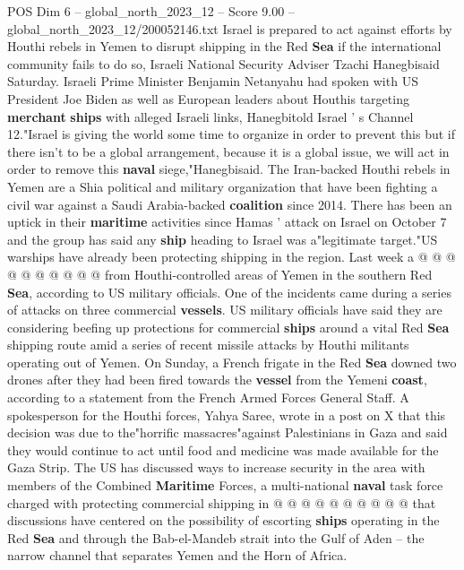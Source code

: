 \begin{textsample}{POS Dim 6 – global\_north\_2023\_12 – Score 9.00 – global\_north\_2023\_12/200052146.txt}  \label{ex:f6_pos_138}
Israel is prepared to act against efforts by Houthi rebels in Yemen to disrupt shipping in the Red \textbf{Sea} if the international community fails to do so, Israeli National Security Adviser Tzachi Hanegbisaid Saturday.
Israeli Prime Minister Benjamin Netanyahu had spoken with US President Joe Biden as well as European leaders about Houthis targeting \textbf{merchant} \textbf{ships} with alleged Israeli links, Hanegbitold Israel ' s Channel 12."Israel is giving the world some time to organize in order to prevent this but if there isn't to be a global arrangement, because it is a global issue, we will act in order to remove this \textbf{naval} siege,"Hanegbisaid.
The Iran-backed Houthi rebels in Yemen are a Shia political and military organization that have been fighting a civil war against a Saudi Arabia-backed \textbf{coalition} since 2014.
There has been an uptick in their \textbf{maritime} activities since Hamas ' attack on Israel on October 7 and the group has said any \textbf{ship} heading to Israel was a"legitimate target."US warships have already been protecting shipping in the region.
Last week a @ @ @ @ @ @ @ @ @ @ from Houthi-controlled areas of Yemen in the southern Red \textbf{Sea}, according to US military officials.
One of the incidents came during a series of attacks on three commercial \textbf{vessels}.
US military officials have said they are considering beefing up protections for commercial \textbf{ships} around a vital Red \textbf{Sea} shipping route amid a series of recent missile attacks by Houthi militants operating out of Yemen.
On Sunday, a French frigate in the Red \textbf{Sea} downed two drones after they had been fired towards the \textbf{vessel} from the Yemeni \textbf{coast}, according to a statement from the French Armed Forces General Staff.
A spokesperson for the Houthi forces, Yahya Saree, wrote in a post on X that this decision was due to the"horrific massacres"against Palestinians in Gaza and said they would continue to act until food and medicine was made available for the Gaza Strip.
The US has discussed ways to increase security in the area with members of the Combined \textbf{Maritime} Forces, a multi-national \textbf{naval} task force charged with protecting commercial shipping in @ @ @ @ @ @ @ @ @ @ that discussions have centered on the possibility of escorting \textbf{ships} operating in the Red \textbf{Sea} and through the Bab-el-Mandeb strait into the Gulf of Aden -- the narrow channel that separates Yemen and the Horn of Africa.

\end{textsample}
